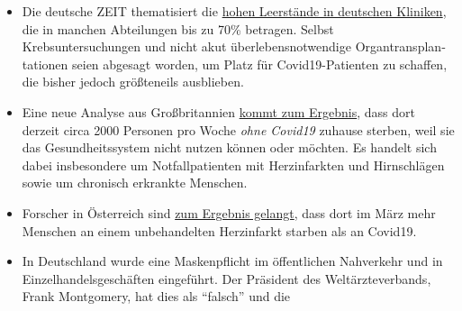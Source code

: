 \begin{itemize}
{  Pressekonferenz} von seinen bisherigen Beobachtungen bezüglich
  Covid19. In Kalifornien und anderen Bundesstaaten seien die
  Krankenhäuser und Intensivstationen bisher weitgehend leer geblieben.
  Dr. Erickson berichtet von Ärzten aus mehreren US-Bundesstaaten, die
  ``unter Druck gesetzt'' wurden, Totenscheine auf Covid19 auszustellen,
  obwohl sie selbst nicht dieser Ansicht waren. Dr. Erickson empfiehlt,
  nur die Kranken und nicht die Gesunden bzw. die ganze Gesellschaft
  unter Quarantäne zu stellen, da dies auch negative Auswirkungen auf
  die Gesundheit und Psyche haben könne. So sei bereits eine deutliche
  Zunahme von ``Sekundäreffekten'' wie Alkoholismus, Depressionen,
  Suiziden sowie Missbrauch von Kindern und Ehepartnern zu beobachten.
  Dr. Erickson schätzt die Letalität von Covid-19 aufgrund der
  bisherigen Zahlen aus verschiedenen Ländern auf ca. 0.1\%, ähnlich
  einer Influenza. Ein Mundschutz mache nur in akuten Situationen wie im
  Krankenhaus Sinn, nicht jedoch im Alltag. (\textbf{Hinweis}: Youtube
  löschte die Pressekonferenz nach über 5 Millionen Views.)
\item
  Die deutsche ZEIT thematisiert die
  \href{https://www.zeit.de/2020/18/kliniken-coronavirus-intensivbetten-patienten-behandlung-notaufnahme}{hohen
  Leerstände in deutschen Kliniken}, die in manchen Abteilungen bis zu
  70\% betragen. Selbst Krebsuntersuchungen und nicht akut
  überlebens­notwendige Organ­trans­plan­tationen seien abgesagt worden,
  um Platz für Covid19-Patienten zu schaffen, die bisher jedoch
  größteneils ausblieben.
\item
  Eine neue Analyse aus Großbritannien
  \href{https://www.telegraph.co.uk/global-health/science-and-disease/two-new-waves-deaths-break-nhs-new-analysis-warns/}{kommt
  zum Ergebnis}, dass dort derzeit circa 2000 Personen pro Woche
  \emph{ohne Covid19} zuhause sterben, weil sie das Gesundheitssystem
  nicht nutzen können oder möchten. Es handelt sich dabei insbesondere
  um Notfallpatienten mit Herzinfarkten und Hirnschlägen sowie um
  chronisch erkrankte Menschen.
\item
  Forscher in Österreich sind
  \href{https://academic.oup.com/eurheartj/advance-article/doi/10.1093/eurheartj/ehaa314/5820829}{zum
  Ergebnis gelangt}, dass dort im März mehr Menschen an einem
  unbehandelten Herzinfarkt starben als an Covid19.
\item
  In Deutschland wurde eine Maskenpflicht im öffentlichen Nahverkehr und
  in Einzel­handels­geschäften eingeführt. Der Präsident des
  Weltärzteverbands, Frank Montgomery, hat dies als ``falsch'' und die

\end{itemize}
